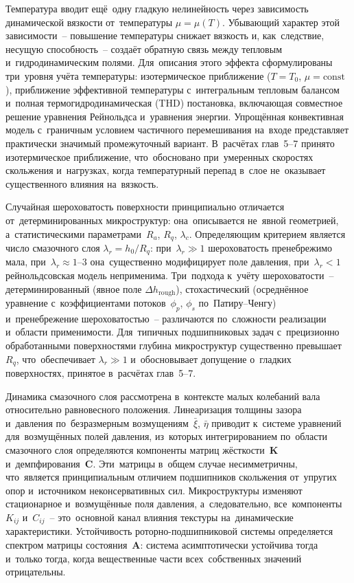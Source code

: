 Температура вводит ещё~одну гладкую нелинейность через
зависимость динамической вязкости от~температуры
$\mu = \mu(T)$. Убывающий характер этой зависимости~--
повышение температуры снижает вязкость и, как~следствие,
несущую способность~-- создаёт обратную связь между тепловым
и~гидродинамическим полями. Для~описания этого эффекта
сформулированы три~уровня учёта температуры: изотермическое
приближение ($T = T_0$, $\mu = \mathrm{const}$), приближение
эффективной температуры с~интегральным тепловым балансом
и~полная термогидродинамическая (THD) постановка, включающая
совместное решение уравнения Рейнольдса и~уравнения энергии.
Упрощённая конвективная модель с~граничным условием частичного
перемешивания на~входе представляет практически значимый
промежуточный вариант. В~расчётах глав~5--7 принято
изотермическое приближение, что~обосновано при~умеренных
скоростях скольжения и~нагрузках, когда температурный перепад
в~слое не~оказывает существенного влияния на~вязкость.

Случайная шероховатость поверхности принципиально отличается
от~детерминированных микроструктур: она~описывается не~явной
геометрией, а~статистическими параметрами~$R_a$, $R_q$,
$\lambda_c$. Определяющим критерием является число смазочного
слоя $\lambda_r = h_0/R_q$: при~$\lambda_r \gg 1$
шероховатость пренебрежимо мала,
при~$\lambda_r \approx 1$--$3$ она~существенно модифицирует
поле давления, при~$\lambda_r < 1$ рейнольдсовская модель
неприменима. Три~подхода к~учёту шероховатости~--
детерминированный (явное поле $\Delta h_{\mathrm{rough}}$),
стохастический (осреднённое уравнение с~коэффициентами
потоков~$\phi_p$, $\phi_s$ по~Патиру--Ченгу) и~пренебрежение
шероховатостью~-- различаются по~сложности реализации и~области
применимости. Для~типичных подшипниковых задач с~прецизионно
обработанными поверхностями глубина микроструктур существенно
превышает~$R_q$, что~обеспечивает $\lambda_r \gg 1$
и~обосновывает допущение о~гладких поверхностях, принятое
в~расчётах глав~5--7.

Динамика смазочного слоя рассмотрена в~контексте малых
колебаний вала относительно равновесного положения.
Линеаризация толщины зазора и~давления по~безразмерным
возмущениям~$\bar{\xi}$, $\bar{\eta}$ приводит к~системе
уравнений для~возмущённых полей давления, из~которых
интегрированием по~области смазочного слоя определяются
компоненты матриц жёсткости~$\mathbf{K}$
и~демпфирования~$\mathbf{C}$. Эти~матрицы в~общем случае
несимметричны, что~является принципиальным отличием
подшипников скольжения от~упругих опор и~источником
неконсервативных сил. Микроструктуры изменяют стационарное
и~возмущённые поля давления, а~следовательно,
все~компоненты~$K_{ij}$ и~$C_{ij}$~-- это~основной канал
влияния текстуры на~динамические характеристики. Устойчивость
роторно-подшипниковой системы определяется спектром матрицы
состояния~$\mathbf{A}$: система асимптотически устойчива тогда
и~только тогда, когда вещественные части всех~собственных
значений отрицательны.

